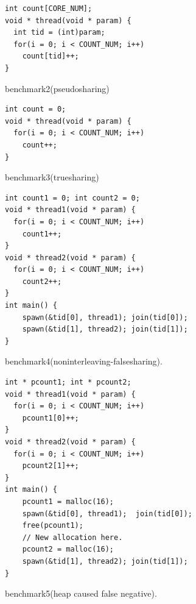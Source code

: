 \begin{figure}[!t]
\begin{lstlisting}
int count[CORE_NUM];
void * thread(void * param) {
  int tid = (int)param;
  for(i = 0; i < COUNT_NUM; i++)
    count[tid]++;       
}
\end{lstlisting}
\caption{benchmark2(pseudosharing)
\label{fig:benchmark2}}
\end{figure}

\begin{figure}[!t]
\begin{lstlisting}
int count = 0; 
void * thread(void * param) {
  for(i = 0; i < COUNT_NUM; i++) 
    count++;       
}
\end{lstlisting}
\caption{benchmark3(truesharing)
\label{fig:benchmark3}}
\end{figure}

\begin{figure}[!t]
\begin{lstlisting}
int count1 = 0; int count2 = 0;
void * thread1(void * param) {
  for(i = 0; i < COUNT_NUM; i++)
    count1++;       
}
void * thread2(void * param) {
  for(i = 0; i < COUNT_NUM; i++)
    count2++;       
}
int main() {
	spawn(&tid[0], thread1); join(tid[0]);
	spawn(&tid[1], thread2); join(tid[1]);
}
\end{lstlisting}
\caption{benchmark4(noninterleaving-falsesharing).
\label{fig:benchmark4}}
\end{figure}

\begin{figure}[!t]
\begin{lstlisting}
int * pcount1; int * pcount2;
void * thread1(void * param) {
  for(i = 0; i < COUNT_NUM; i++)
    pcount1[0]++;       
}
void * thread2(void * param) {
  for(i = 0; i < COUNT_NUM; i++)
    pcount2[1]++;       
}
int main() {
	pcount1 = malloc(16);
    spawn(&tid[0], thread1);  join(tid[0]); 
    free(pcount1);
	// New allocation here.
	pcount2 = malloc(16);
    spawn(&tid[1], thread2); join(tid[1]);
}
\end{lstlisting}
\caption{benchmark5(heap caused false negative).
\label{fig:benchmark5}}
\end{figure}

